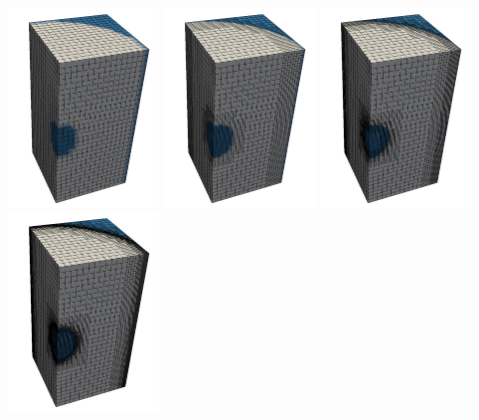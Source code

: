 \begin{center}
\includegraphics[width=4cm]{images/stokes_sphere3D/aspect_amr_CYL/C1_0}
\includegraphics[width=4cm]{images/stokes_sphere3D/aspect_amr_CYL/C1_1}
\includegraphics[width=4cm]{images/stokes_sphere3D/aspect_amr_CYL/C1_2}
\includegraphics[width=4cm]{images/stokes_sphere3D/aspect_amr_CYL/C1_3}
\end{center}

